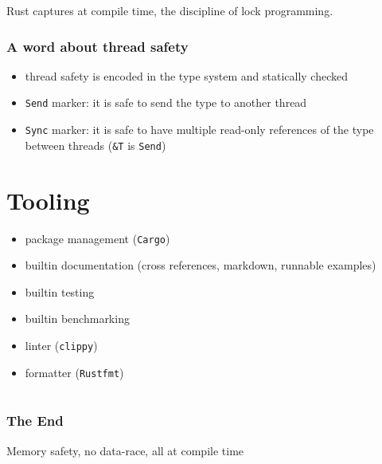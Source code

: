 \documentclass{beamer}
\begin{document}
\begin{frame}
    Rust captures at compile time, the discipline of lock programming.
\end{frame}

\begin{frame}
    \frametitle{A word about thread safety}
    \begin{itemize}
        \item thread safety is encoded in the type system and statically checked
        \item \texttt{Send} marker: it is safe to send the type to another thread
        \item \texttt{Sync} marker: it is safe to have multiple read-only references of the type between threads (\texttt{\&T} is \texttt{Send})
    \end{itemize}
\end{frame}

\section{Tooling}

\begin{frame}
    \begin{itemize}
        \item package management (\texttt{Cargo})
        \item builtin documentation (cross references, markdown, runnable examples)
        \item builtin testing
        \item builtin benchmarking
        \item linter (\texttt{clippy})
        \item formatter (\texttt{Rustfmt})
    \end{itemize}
\end{frame}


\section*{}

{%
    \begin{frame}
        \frametitle{The End}
        Memory safety, no data-race, all at compile time
    \end{frame}
}
\end{document}

